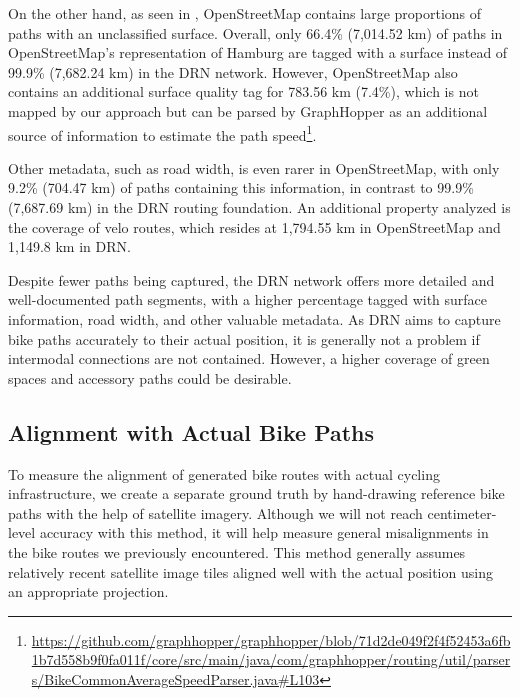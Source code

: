 On the other hand, as seen in , OpenStreetMap contains large proportions of paths with an unclassified surface. Overall, only 66.4\% (7,014.52 km) of paths in OpenStreetMap's representation of Hamburg are tagged with a surface instead of 99.9\% (7,682.24 km) in the DRN network. However, OpenStreetMap also contains an additional surface quality tag for 783.56 km (7.4\%), which is not mapped by our approach but can be parsed by GraphHopper as an additional source of information to estimate the path speed\footnote{\url{https://github.com/graphhopper/graphhopper/blob/71d2de049f2f4f52453a6fb1b7d558b9f0fa011f/core/src/main/java/com/graphhopper/routing/util/parsers/BikeCommonAverageSpeedParser.java\#L103}}. 

Other metadata, such as road width, is even rarer in OpenStreetMap, with only 9.2\% (704.47 km) of paths containing this information, in contrast to 99.9\% (7,687.69 km) in the DRN routing foundation. An additional property analyzed is the coverage of velo routes, which resides at 1,794.55 km in OpenStreetMap and 1,149.8 km in DRN.

Despite fewer paths being captured, the DRN network offers more detailed and well-documented path segments, with a higher percentage tagged with surface information, road width, and other valuable metadata. As DRN aims to capture bike paths accurately to their actual position, it is generally not a problem if intermodal connections are not contained. However, a higher coverage of green spaces and accessory paths could be desirable. 

\subsection{Alignment with Actual Bike Paths}\label{sec:routing-alignment}

To measure the alignment of generated bike routes with actual cycling infrastructure, we create a separate ground truth by hand-drawing reference bike paths with the help of satellite imagery. Although we will not reach centimeter-level accuracy with this method, it will help measure general misalignments in the bike routes we previously encountered. This method generally assumes relatively recent satellite image tiles aligned well with the actual position using an appropriate projection.

